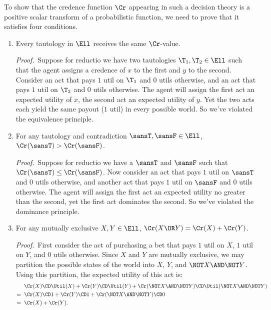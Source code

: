 To show that the credence function $\Cr$ appearing in such a decision theory is a positive scalar transform of a probabilistic function, we need to prove that it satisfies four conditions.
\begin{enumerate}
\item Every tautology in $\Ell$ receives the same $\Cr$-value.

\emph{Proof}.\, Suppose for reductio we have two tautologies $\T_1, \T_2 \in \Ell$ such that the agent assigns a credence of $x$ to the first and $y$ to the second. Consider an act that pays $1$ util on $\T_1$ and $0$ utils otherwise, and an act that pays $1$ util on $\T_2$ and $0$ utils otherwise. The agent will assign the first act an expected utility of $x$, the second act an expected utility of $y$. Yet the two acts each yield the same payout ($1$ util) in every possible world. So we've violated the equivalence principle.

\item For any tautology and contradiction $\sansT, \sansF \in \Ell$, $\Cr(\sansT)>\Cr(\sansF)$.

\emph{Proof}.\, Suppose for reductio we have a $\sansT$ and $\sansF$ such that $\Cr(\sansT) \leq \Cr(\sansF)$. Now consider an act that pays $1$ util on $\sansT$ and $0$ utils otherwise, and another act that pays $1$ util on $\sansF$ and $0$ utils otherwise. The agent will assign the first act an expected utility no greater than the second, yet the first act dominates the second. So we've violated the dominance principle.

\item For any mutually exclusive $X, Y \in \Ell$, $\Cr(X \OR Y)=\Cr(X)+\Cr(Y)$.

\emph{Proof}.\, First consider the act of purchasing a bet that pays $1$ util on $X$, $1$ util on $Y$, and $0$ utils otherwise. Since $X$ and $Y$ are mutually exclusive, we may partition the possible states of the world into $X$, $Y$, and $\NOT X \AND \NOT Y$. Using this partition, the expected utility of this act is:
\begin{equation}
\begin{aligned}
  &\;\; \Cr(X) \CD \Util(X) + \Cr(Y) \CD \Util(Y) + \Cr(\NOT X \AND \NOT Y) \CD \Util(\NOT X \AND \NOT Y)\\
= &\;\; \Cr(X) \CD 1 + \Cr(Y) \CD 1 + \Cr(\NOT X \AND \NOT Y) \CD 0\\
= &\;\; \Cr(X) + \Cr(Y).
\end{aligned}
\end{equation}


\end{enumerate}
